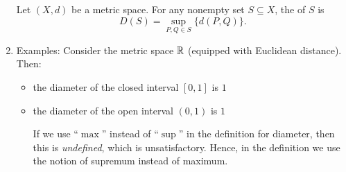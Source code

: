 \begin{enumerate}
Let \((X,d)\) be a metric space. For any nonempty set \(S\subseteq X\), the
 of \(S\) is
\[
D(S)=\sup_{P,Q\in S}\{d(P,Q)\}.
\]
\item Examples: Consider the metric space \(\mathbb{R}\) (equipped with Euclidean
distance). Then:
\begin{itemize}
\item the diameter of the closed interval \([0,1]\) is \(1\)
\item the diameter of the open interval \((0,1)\) is \(1\) \begin{note}
If we use ``\(\max\)'' instead of ``\(\sup\)'' in the definition for diameter,
then this is \emph{undefined}, which is unsatisfactory. Hence, in the
definition we use the notion of supremum instead of maximum.
\end{note}
\end{itemize}
\end{enumerate}
